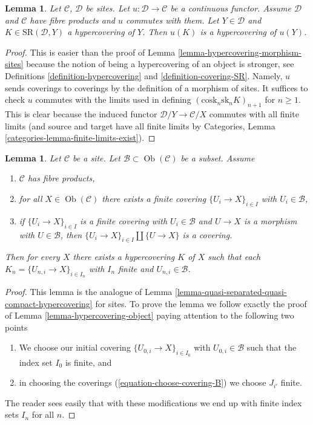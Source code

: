\documentclass{stacks-project}
\theoremstyle{plain}
\newtheorem{lemma}[subsection]{Lemma}
\theoremstyle{definition}
\theoremstyle{remark}
\numberwithin{equation}{subsection}
\def\Ob{\mathop{\mathrm{Ob}}\nolimits}
\begin{document}
\begin{lemma}
\label{lemma-hypercovering-continuous-functor}
Let $\mathcal{C}$, $\mathcal{D}$ be sites. Let
$u : \mathcal{D} \to \mathcal{C}$ be a continuous functor.
Assume $\mathcal{D}$ and $\mathcal{C}$ have fibre products
and $u$ commutes with them. Let $Y \in \mathcal{D}$ and
$K \in \text{SR}(\mathcal{D}, Y)$ a hypercovering of $Y$.
Then $u(K)$ is a hypercovering of $u(Y)$.
\end{lemma}

\begin{proof}
This is easier than the proof of Lemma \ref{lemma-hypercovering-morphism-sites}
because the notion of being a hypercovering of an object is stronger, see
Definitions \ref{definition-hypercovering} and \ref{definition-covering-SR}.
Namely, $u$ sends coverings to coverings by the definition of
a morphism of sites. It suffices to check $u$ commutes with the
limits used in defining
$(\text{cosk}_n \text{sk}_n K)_{n + 1}$ for $n \geq 1$.
This is clear because the induced functor
$\mathcal{D}/Y \to \mathcal{C}/X$ commutes with all finite limits
(and source and target have all finite limits by
Categories, Lemma \ref{categories-lemma-finite-limits-exist}).
\end{proof}

\begin{lemma}
\label{lemma-w-contractible}
Let $\mathcal{C}$ be a site. Let $\mathcal{B} \subset \Ob(\mathcal{C})$
be a subset. Assume
\begin{enumerate}
\item $\mathcal{C}$ has fibre products,
\item for all $X \in \Ob(\mathcal{C})$ there exists a finite covering
$\{U_i \to X\}_{i \in I}$ with $U_i \in \mathcal{B}$,
\item if $\{U_i \to X\}_{i \in I}$ is a finite covering with
$U_i \in \mathcal{B}$ and $U \to X$ is a morphism with $U \in \mathcal{B}$,
then $\{U_i \to X\}_{i \in I} \amalg \{U \to X\}$ is a covering.
\end{enumerate}
Then for every $X$ there exists a hypercovering $K$ of $X$
such that each $K_n = \{U_{n, i} \to X\}_{i \in I_n}$ with
$I_n$ finite and $U_{n, i} \in \mathcal{B}$.
\end{lemma}

\begin{proof}
This lemma is the analogue of
Lemma \ref{lemma-quasi-separated-quasi-compact-hypercovering}
for sites. To prove the lemma we follow exactly the proof of
Lemma \ref{lemma-hypercovering-object}
paying attention to the following two points
\begin{enumerate}
\item[(a)] We choose our initial covering $\{U_{0, i} \to X\}_{i \in I_0}$
with $U_{0, i} \in \mathcal{B}$ such that the index set $I_0$ is finite, and
\item[(b)] in choosing the coverings
(\ref{equation-choose-covering-B})
we choose $J_{i'}$ finite.
\end{enumerate}
The reader sees easily that with these modifications we end up
with finite index sets $I_n$ for all $n$.
\end{proof}
\end{document}
